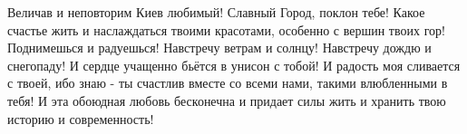 Величав и неповторим Киев любимый! Славный Город, поклон тебе! Какое счастье
жить и наслаждаться твоими красотами, особенно с вершин твоих гор! Поднимешься
и радуешься! Навстречу ветрам и солнцу!  Навстречу дождю и снегопаду! И сердце
учащенно бьётся в унисон с тобой! И радость моя сливается с твоей, ибо знаю -
ты счастлив вместе со всеми нами, такими влюбленными в тебя! И эта обоюдная
любовь бесконечна и придает силы жить и хранить твою историю и современность!
